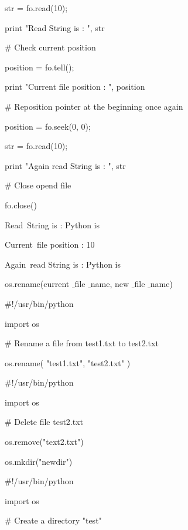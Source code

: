 str = fo.read(10); \par
print "Read String is : ", str \par
\vspace{12pt}
 $  \#  $ Check current position \par
position = fo.tell(); \par
print "Current file position : ", position \par
\vspace{12pt}
 $  \#  $ Reposition pointer at the beginning once again \par
position = fo.seek(0, 0); \par
str = fo.read(10); \par
print "Again read String is : ", str \par
 $  \#  $ Close opend file \par
fo.close() \par
\vspace{12pt}
Read~String is :  Python is \par
Current~file position :  10 \par
Again~read String is :  Python is \par
\vspace{12pt}
os.rename(current $  \_  $file $  \_  $name, new $  \_  $file $  \_  $name) \par
\vspace{12pt}
 $  \#  $!/usr/bin/python \par
import os \par
\vspace{12pt}
 $  \#  $ Rename a file from test1.txt to test2.txt \par
os.rename( "test1.txt", "test2.txt" ) \par
\vspace{12pt}
 $  \#  $!/usr/bin/python \par
import os \par
\vspace{12pt}
 $  \#  $ Delete file test2.txt \par
os.remove("text2.txt") \par
\vspace{12pt}
os.mkdir("newdir") \par
\vspace{12pt}
 $  \#  $!/usr/bin/python \par
import os \par
\vspace{12pt}
 $  \#  $ Create a directory "test" \par
